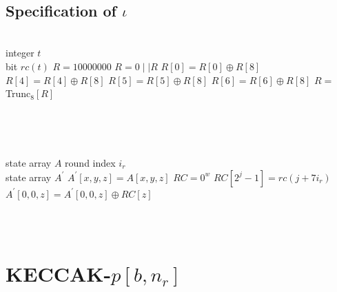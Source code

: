 \documentclass[12pt,a4paper,oneside]{report}
\newcommand{\inputmintedindent}[2]{
    \begin{minipage}{0.1\linewidth}\end{minipage}
    \begin{minipage}{0.85\linewidth}
        \inputminted[linenos,breaklines,fontsize=\footnotesize]{#1}{#2}
    \end{minipage}\\[0.5em]
}
\begin{document}
\inputmintedindent{C}{code_split/sha3_step_chi.c}

\subsection{Specification of $\iota$}
\begin{algorithm}[H]
    \begin{algorithmic}
        \Require \\
        integer $t$
        \Ensure \\
        bit $rc(t)$
                \State {}
            \EndIf
            \State $R=10000000$
                    \State $R=0 \mid\mid R$
                    \State $R[0]=R[0] \oplus R[8]$
                    \State $R[4]=R[4] \oplus R[8]$
                    \State $R[5]=R[5] \oplus R[8]$
                    \State $R[6]=R[6] \oplus R[8]$
                    \State $R=$Trunc$_8 [R]$
                \EndFor
                \State {}  
        \EndFunction  
    \end{algorithmic}  
\end{algorithm}

\inputmintedindent{C}{code_split/sha3_generate_rc.c}


\begin{algorithm}[H]
    \begin{algorithmic}
        \Require \\
        state array $A$
        round index $i_r$
        \Ensure \\
        state array $A^{'}$
                \State $A^{'}[x,y,z]=A[x,y,z]$
            \EndFor
            \State $RC=0^w$
                \State $RC[2^j-1]=rc(j+7i_r)$
            \EndFor
                \State $A^{'}[0,0,z]=A^{'}[0,0,z] \oplus RC[z]$
            \EndFor
            \State {}  
        \EndFunction  
    \end{algorithmic}  
\end{algorithm}

\inputmintedindent{C}{code_split/sha3_step_iota.c}


\section{KECCAK-$p[b, n_r]$}
\end{document}
